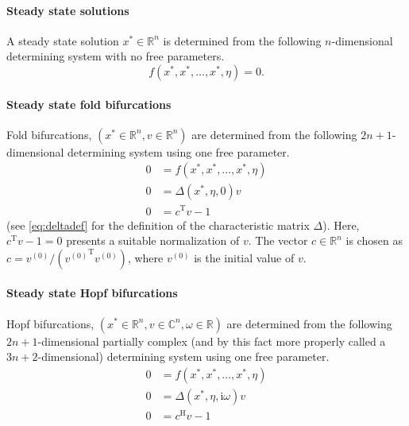 \documentclass[10pt]{scrartcl}
\renewcommand{\i}{\mathrm{i}}
\newcommand{\T}{\mathrm{T}}
\renewcommand{\H}{\mathrm{H}}
\newcommand{\RR}{\mathbb{R}}
\newcommand{\CC}{\mathbb{C}}
\begin{document}
{\paragraph{Steady state solutions}
A steady state solution $x^*\in\RR^n$ is determined from the following
$n$-dimensional determining system with no free parameters.
\begin{equation}\label{determ_stst}
f(x^*,x^*,\ldots,x^*,\eta)=0.
\end{equation}

\paragraph{Steady state fold bifurcations}
Fold bifurcations, $(x^*\in\RR^n,v\in\RR^n)$ are determined 
from the following
$2n+1$-dimensional determining system using one free
parameter.
\begin{equation}\label{determ_fold}
\begin{aligned}
0&=f(x^*,x^*,\ldots,x^*,\eta) \\
0&=\Delta(x^*,\eta,0)v\\
0&=c^\T v-1
\end{aligned}
\end{equation}
(see \eqref{eq:deltadef} for the definition of the characteristic
matrix $\Delta$). Here, $c^\T v-1=0$ presents a suitable normalization
of $v$.  The vector $c\in\RR^n$ is chosen as $c=v^{(0)}/({v^{(0)}}^\T
v^{(0)})$, where $v^{(0)}$ is the initial value of $v$.

\paragraph{Steady state Hopf bifurcations}
Hopf bifurcations, $(x^*\in\RR^n,v\in\CC^n,\omega\in\RR)$ are
determined from the following $2n+1$-dimensional partially complex
(and by this fact more properly called a $3n+2$-dimensional)
determining system using one free parameter.
\begin{equation}\label{determ_hopf}
\begin{aligned}
0&=f(x^*,x^*,\ldots,x^*,\eta)\\
0&=\Delta(x^*,\eta,\i\omega)v\\
0&=c^\H v-1\\
\end{aligned}
\end{equation}

}
\end{document}
